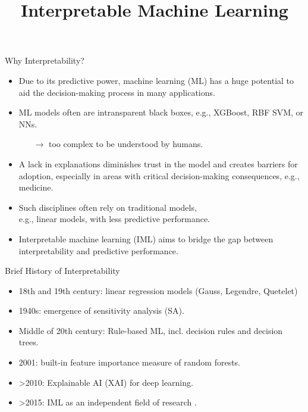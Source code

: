 \documentclass[11pt,compress,t,notes=noshow, xcolor=table]{beamer}
\title{Interpretable Machine Learning}
\institute{\href{https://compstat-lmu.github.io/lecture_iml/}{compstat-lmu.github.io/lecture\_iml}}
\date{}
\begin{document}


\newcommand{\titlefigure}{figure/open_blackbox}
\newcommand{\learninggoals}{
\item Why do we need interpretability?
\item What have been the developments until now?}





	\begin{vbframe}{Why Interpretability?}
		
		\begin{itemize}
			\item Due to its predictive power, machine learning (ML) has a huge potential to aid the decision-making process in many applications.
			\smallskip
			\item ML models often are intransparent black boxes, e.g., XGBoost, RBF SVM, or NNs.
			\begin{itemize}
				\item[$\rightarrow$] too complex to be understood by humans.
			\end{itemize}
			\smallskip
			\item A lack in explanations diminishes trust in the model and creates barriers for adoption, especially in areas with critical decision-making consequences, e.g., medicine.
			\smallskip
			\item Such disciplines often rely on traditional models,\\ e.g., linear models, with less predictive performance.
			\smallskip
			\item Interpretable machine learning (IML) aims to bridge the gap between interpretability and predictive performance.
		\end{itemize}
		
	\end{vbframe}
	
	
	\begin{vbframe}{Brief History of Interpretability}
		\begin{itemize}
			\item 18th and 19th century: linear regression models (Gauss, Legendre, Quetelet)
			\medskip
			\item 1940s: emergence of sensitivity analysis (SA).
			\medskip
			\item Middle of 20th century: Rule-based ML, incl. decision rules and decision trees.
			\medskip
			\item 2001: built-in feature importance measure of random forests.
			\medskip
			\item >2010: Explainable AI (XAI) for deep learning.
			\medskip
			\item >2015: IML as an independent field of research .
		\end{itemize}
	\end{vbframe}
	
\end{document}
